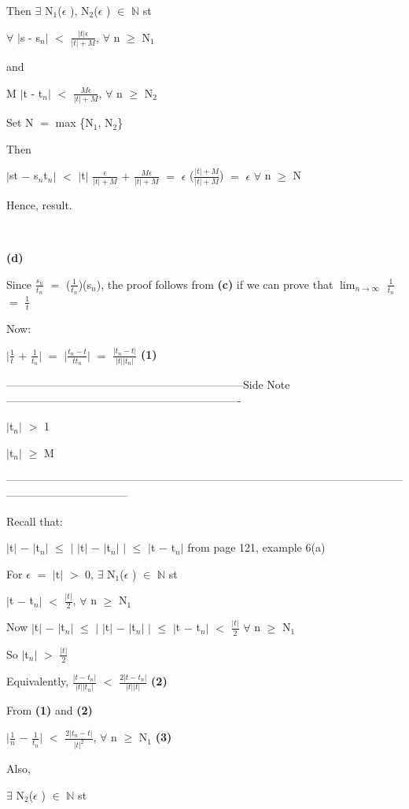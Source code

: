 \documentclass{article}
\newcommand{\mt}[1]{\ensuremath{#1}}
\newcommand{\bpth}[1]{\textbf{(#1)}}
\newcommand{\sidenote}[1]{-----------------------------------------------------------------Side Note----------------------------------------------------------------
#1 \

---------------------------------------------------------------------------------------------------------------------------------------------}
\newcommand{\bn}{\mt{\mathbb{N}} }       %
\newcommand{\ep}{\mt{\epsilon} }         %
\newcommand{\fa}{\mt{\forall} }          %
\newcommand{\mem}{\mt{\in} }
\newcommand{\exs}{\mt{\exists} }
\newcommand{\eql}{\mt{=} }
\newcommand{\uw}[2]{#1\mt{_{#2}}}
\newcommand{\frc}[2]{\mt{\frac{#1}{#2}}}
\newcommand{\lmti}[1]{\mt{\displaystyle{\lim_{#1 \to \infty}}}}
\begin{document}
{{Then \exs \uw{N}{1}(\ep), \uw{N}{2}(\ep) \mem \bn st

\fa $|$s - \uw{s}{n}$|$ $<$ $\frac{|t|\epsilon}{|t| + M}$, \fa n $\geq$ \uw{N}{1}

and

M $|$t - \uw{t}{n}$|$ $<$ $\frac{M\epsilon}{|t| + M}$, \fa n $\geq$ \uw{N}{2}

Set N \eql max \{\uw{N}{1}, \uw{N}{2}\}

Then

$|$st $-$ \uw{s}{n}\uw{t}{n}$|$ $<$ $|$t$|$ $\frac{\epsilon}{|t| + M}$ $+$ $\frac{M \ep}{|t| + M}$ \eql \ep ($\frac{|t| + M}{|t| + M}$) \eql \ep \fa n $\geq$ N

Hence, result. \

\

\bpth{d}

Since $\frac{\uw{s}{n}}{\uw{t}{n}}$ \eql (\frc{1}{\uw{t}{n}})(\uw{s}{n}), the proof follows from \bpth{c} if we can prove that \lmti{n} \frc{1}{\uw{t}{n}} \eql \frc{1}{t}

Now:

$|$\frc{1}{t} $+$ \frc{1}{\uw{t}{n}}$|$ \eql $|$\frc{\uw{t}{n} - t}{t\uw{t}{n}}$|$ \eql \frc{|\uw{t}{n} - t|}{|t||\uw{t}{n}|} \bpth{1}

\sidenote{
$|$\uw{t}{n}$|$ $>$ 1

$|$\uw{t}{n}$|$ $\geq$ M
}

Recall that:

$|$t$|$ $-$ $|$\uw{t}{n}$|$ $\leq$ $|$ $|$t$|$ $-$ $|$\uw{t}{n}$|$ $|$ $\leq$ $|$t $-$ \uw{t}{n}$|$ from page 121, example 6(a)

For \ep \eql $|$t$|$ $>$ 0, \exs \uw{N}{1}(\ep) \mem \bn st

$|$t $-$ \uw{t}{n}$|$ $<$ \frc{|t|}{2}, \fa n $\geq$ \uw{N}{1}

Now $|$t$|$ $-$ $|$\uw{t}{n}$|$ $\leq$ $|$ $|$t$|$ $-$ $|$\uw{t}{n}$|$ $|$ $\leq$ $|$t $-$ \uw{t}{n}$|$ $<$ $\frac{|t|}{2}$ \fa n $\geq$ \uw{N}{1}

So $|$\uw{t}{n}$|$ $>$ $\frac{|t|}{2}$

Equivalently, $\frac{|t - \uw{t}{n}|}{|t||\uw{t}{n}|}$ $<$ $\frac{2|t - \uw{t}{n}|}{|t||t|}$ \bpth{2}

From \bpth{1} and \bpth{2}

$|$\frc{1}{n} $-$ \frc{1}{\uw{t}{n}}$|$ $<$ $\frac{2|\uw{t}{n} - t|}{|t|^2}$, \fa n $\geq$ \uw{N}{1} \bpth{3}

Also,

\exs \uw{N}{2}(\ep) \mem \bn st

}}
\end{document}
